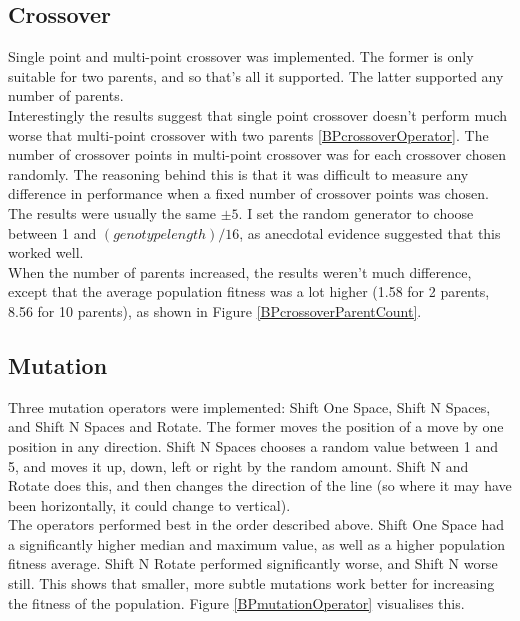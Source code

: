 \documentclass[]{report}
\begin{document}
\subsection{Crossover}
Single point and multi-point crossover was implemented. The former is only suitable for two parents, and so that's all it supported. The latter supported any number of parents. \\

Interestingly the results suggest that single point crossover doesn't perform much worse that multi-point crossover with two parents \ref{BPcrossoverOperator}. The number of crossover points in multi-point crossover was for each crossover chosen randomly. The reasoning behind this is that it was difficult to measure any difference in performance when a fixed number of crossover points was chosen. The results were usually the same $\pm 5$. I set the random generator to choose between 1 and $(genotype length)/16$, as anecdotal evidence suggested that this worked well.\\

When the number of parents increased, the results weren't much difference, except that the average population fitness was a lot higher (1.58 for 2 parents, 8.56 for 10 parents), as shown in Figure \ref{BPcrossoverParentCount}.

\subsection{Mutation}
Three mutation operators were implemented: Shift One Space, Shift N Spaces, and Shift N Spaces and Rotate. The former moves the position of a move by one position in any direction. Shift N Spaces chooses a random value between 1 and 5, and moves it up, down, left or right by the random amount. Shift N and Rotate does this, and then changes the direction of the line (so where it may have been horizontally, it could change to vertical).\\

The operators performed best in the order described above. Shift One Space had a significantly higher median and maximum value, as well as a higher population fitness average. Shift N Rotate performed significantly worse, and Shift N worse still. This shows that smaller, more subtle mutations work better for increasing the fitness of the population. Figure \ref{BPmutationOperator} visualises this.\\
\end{document}
